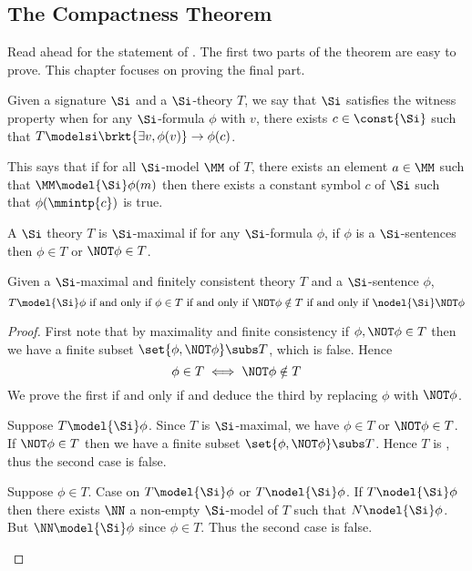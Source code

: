 \subsection{The Compactness Theorem}

Read ahead for the statement of .
The first two parts of the theorem are easy to prove.
This chapter focuses on proving the final part.

\begin{dfn}
    Given a signature $\Si$ and a $\Si$-theory $T$, 
    we say that $\Si$ satisfies the witness property when
    for any $\Si$-formula $\phi$ with 
     $v$,
    there exists $c \in \const{\Si}$ such that 
    $T \modelsi \brkt{\exists v, \phi(v)} \to \phi(c)$.
\end{dfn}
This says that if for all $\Si$-model $\MM$ of $T$,
there exists an element $a \in \MM$ such that $\MM \model{\Si} \phi(m)$
then there exists a constant symbol $c$ of $\Si$ 
such that $\phi(\mmintp{c})$ is true.

\begin{dfn}
    A $\Si$ theory $T$ is $\Si$-maximal if for any 
    $\Si$-formula $\phi$,
    if $\phi$ is a $\Si$-sentences then
    $\phi \in T$ or $\NOT \phi \in T$.
\end{dfn}

\begin{prop}
    Given a $\Si$-maximal and finitely consistent theory $T$ and
    a $\Si$-sentence $\phi$, 
    \[ T \model{\Si} \phi \text{ if and only if } \phi \in T
    \text{ if and only if } \NOT \phi \notin T
    \text{ if and only if } \nodel{\Si} \NOT \phi\]   
\end{prop}
\begin{proof}
    First note that by maximality and finite consistency
    if $\phi, \NOT \phi \in T$ then we have a finite 
     subset 
    $\set{\phi,\NOT \phi} \subs T$, which is false. 
    Hence
    \[\phi \in T \iff \NOT \phi \notin T\]
    We prove the first if and only if and deduce the third by 
    replacing $\phi$ with $\NOT \phi$.
        \begin{forward}
            Suppose $T \model{\Si} \phi$.
            Since $T$ is $\Si$-maximal, 
            we have $\phi \in T$ or $\NOT \phi \in T$.
            If $\NOT \phi \in T$ then we have a finite subset 
            $\set{\phi,\NOT \phi} \subs T$.
            Hence $T$ is ,  
            thus the second case is false.
        \end{forward}
        \begin{backward}
            Suppose $\phi \in T$. 
            Case on $T \model{\Si} \phi$ or $T \nodel{\Si} \phi$.
            If $T \nodel{\Si} \phi$ then there exists 
            $\NN$ a non-empty $\Si$-model of $T$ such that 
            $N \nodel{\Si} \phi$.
            But $\NN \model{\Si} \phi$ since $\phi \in T$.
            Thus the second case is false.
        \end{backward}
\end{proof}

